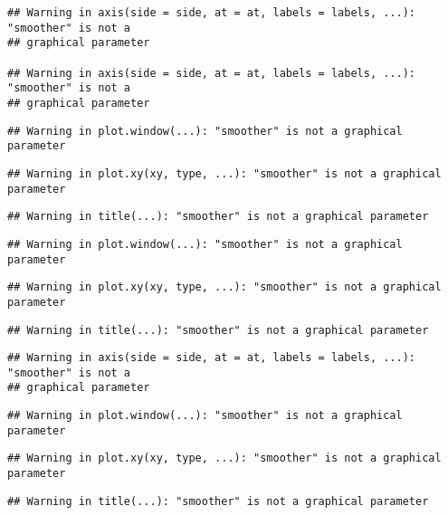 \documentclass[
]{article}
\begin{document}
\begin{verbatim}
## Warning in axis(side = side, at = at, labels = labels, ...): "smoother" is not a
## graphical parameter

## Warning in axis(side = side, at = at, labels = labels, ...): "smoother" is not a
## graphical parameter
\end{verbatim}

\begin{verbatim}
## Warning in plot.window(...): "smoother" is not a graphical parameter
\end{verbatim}

\begin{verbatim}
## Warning in plot.xy(xy, type, ...): "smoother" is not a graphical parameter
\end{verbatim}

\begin{verbatim}
## Warning in title(...): "smoother" is not a graphical parameter
\end{verbatim}

\begin{verbatim}
## Warning in plot.window(...): "smoother" is not a graphical parameter
\end{verbatim}

\begin{verbatim}
## Warning in plot.xy(xy, type, ...): "smoother" is not a graphical parameter
\end{verbatim}

\begin{verbatim}
## Warning in title(...): "smoother" is not a graphical parameter
\end{verbatim}

\begin{verbatim}
## Warning in axis(side = side, at = at, labels = labels, ...): "smoother" is not a
## graphical parameter
\end{verbatim}

\begin{verbatim}
## Warning in plot.window(...): "smoother" is not a graphical parameter
\end{verbatim}

\begin{verbatim}
## Warning in plot.xy(xy, type, ...): "smoother" is not a graphical parameter
\end{verbatim}

\begin{verbatim}
## Warning in title(...): "smoother" is not a graphical parameter
\end{verbatim}
\end{document}
